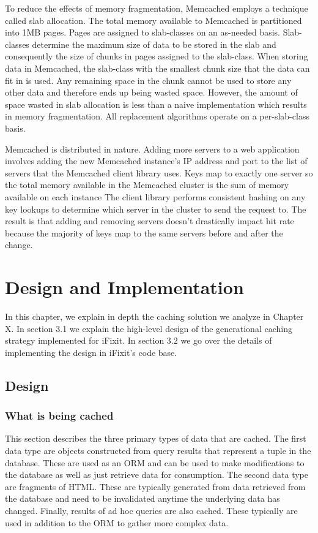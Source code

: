 \documentclass[12pt]{ucthesis}
\begin{document}
To reduce the effects of memory fragmentation, {\textsf Memcached} employs a technique called slab allocation.
The total memory available to {\textsf Memcached} is partitioned into 1MB pages.
Pages are assigned to slab-classes on an as-needed basis.
Slab-classes determine the maximum size of data to be stored in the slab and consequently the size of chunks in pages assigned to the slab-class.
When storing data in {\textsf Memcached}, the slab-class with the smallest chunk size that the data can fit in is used.
Any remaining space in the chunk cannot be used to store any other data and therefore ends up being wasted space.
However, the amount of space wasted in slab allocation is less than a naive implementation which results in memory fragmentation.
All replacement algorithms operate on a per-slab-class basis.

{\textsf Memcached} is distributed in nature.
Adding more servers to a web application involves adding the new {\textsf Memcached} instance's IP address and port to the list of servers that the {\textsf Memcached} client library uses.
Keys map to exactly one server so the total memory available in the {\textsf Memcached} cluster is the sum of memory available on each instance
The client library performs consistent hashing on any key lookups to determine which server in the cluster to send the request to.
The result is that adding and removing servers doesn't drastically impact hit rate because the majority of keys map to the same servers before and after the change.


\chapter{Design and Implementation}
\label{designAndImplementation}
In this chapter, we explain in depth the caching solution we analyze in Chapter X.
In section 3.1 we explain the high-level design of the generational caching strategy implemented for iFixit.
In section 3.2 we go over the details of implementing the design in iFixit's code base.


\section{Design}
\subsection{What is being cached}
This section describes the three primary types of data that are cached.
The first data type are objects constructed from query results that represent a tuple in the database.
These are used as an ORM and can be used to make modifications to the database as well as just retrieve data for consumption.
The second data type are fragments of HTML.
These are typically generated from data retrieved from the database and need to be invalidated anytime the underlying data has changed.
Finally, results of ad hoc queries are also cached.
These typically are used in addition to the ORM to gather more complex data.
\end{document}
